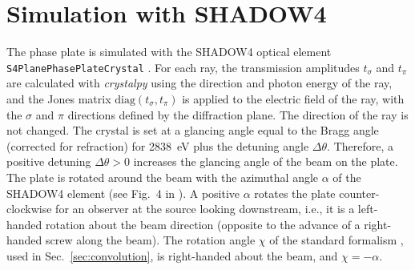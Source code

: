 \documentclass{iucr}
\begin{document}
\section{Simulation with SHADOW4}
\label{sec:simulation}

The phase plate is simulated with the SHADOW4 optical element {\tt S4PlanePhasePlateCrystal} \cite{SanchezdelRio2026efields}. For each ray, the transmission amplitudes $t_\sigma$ and $t_\pi$ are calculated with {\it crystalpy} \cite{Guigay2024} using the direction and photon energy of the ray, and the Jones matrix $\mathrm{diag}(t_\sigma,t_\pi)$ is applied to the electric field of the ray, with the $\sigma$ and $\pi$ directions defined by the diffraction plane. The direction of the ray is not changed.
The crystal is set at a glancing angle equal to the Bragg angle (corrected for refraction) for 2838~eV plus the detuning angle $\Delta\theta$. Therefore, a positive detuning $\Delta\theta>0$ increases the glancing angle of the beam on the plate.
The plate is rotated around the beam with the azimuthal angle $\alpha$ of the SHADOW4 element (see Fig.~4 in \cite{SanchezdelRio2026efields}). A positive $\alpha$ rotates the plate counter-clockwise for an observer at the source looking downstream, i.e., it is a left-handed rotation about the beam direction (opposite to the advance of a right-handed screw along the beam). The rotation angle $\chi$ of the standard formalism \cite{PolarizationDraft}, used in Sec.~\ref{sec:convolution}, is right-handed about the beam, and $\chi=-\alpha$.
\end{document}

